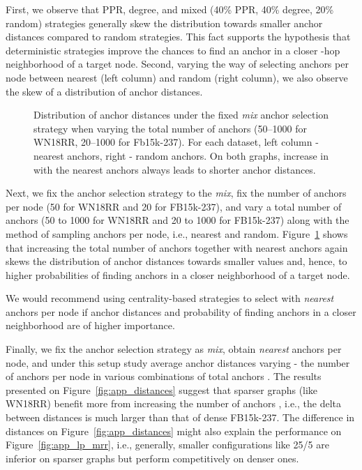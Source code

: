 \documentclass{article} \usepackage{iclr2022_conference,times}
\begin{document}
First, we observe that PPR, degree, and mixed (40\% PPR, 40\% degree, 20\% random) strategies generally skew the distribution towards smaller anchor distances compared to random strategies. 
This fact supports the hypothesis that deterministic strategies improve the chances to find an anchor in a closer -hop neighborhood of a target node. 
Second, varying the way of selecting  anchors per node between nearest (left column) and random (right column), we also observe the skew of a distribution of anchor distances. 

\begin{figure}[t]\centering
    \caption{Distribution of anchor distances under the fixed \emph{mix} anchor selection strategy when varying the total number of anchors  (50--1000 for WN18RR, 20--1000 for Fb15k-237). For each dataset, left column -  nearest anchors, right -  random anchors. On both graphs, increase in  with the nearest anchors always leads to shorter anchor distances. }\label{fig:app_anchor_sel2}\end{figure}


Next, we fix the anchor selection strategy to the \emph{mix}, fix the number of anchors per node (50 for WN18RR and 20 for FB15k-237), and vary a total number of anchors  (50 to 1000 for WN18RR and 20 to 1000 for FB15k-237) along with the method of sampling  anchors per node, i.e., nearest and random. 
Figure~\ref{fig:app_anchor_sel2} shows that increasing the total number of anchors together with  nearest anchors again skews the distribution of anchor distances towards smaller values and, hence, to higher probabilities of finding anchors in a closer neighborhood of a target node. 


We would recommend using centrality-based strategies to select  with  \emph{nearest} anchors per node if anchor distances and probability of finding anchors in a closer neighborhood are of higher importance. 

Finally, we fix the anchor selection strategy as \emph{mix}, obtain \emph{nearest} anchors per node, and under this setup study average anchor distances varying  - the number of anchors per node in various combinations of total anchors .
The results presented on Figure~\ref{fig:app_distances} suggest that sparser graphs (like WN18RR) benefit more from increasing the number of anchors , i.e., the delta between distances is much larger than that of dense FB15k-237.
The difference in distances on Figure~\ref{fig:app_distances} might also explain the performance on Figure~\ref{fig:app_lp_mrr}, i.e., generally, smaller  configurations like 25/5 are inferior on sparser graphs but perform competitively on denser ones.
\end{document}
